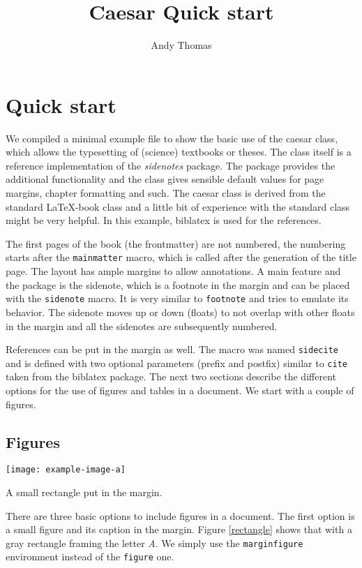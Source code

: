\documentclass{shindig_book}
\title{Caesar Quick start}
\author{Andy Thomas}
\begin{document}
\frontmatter
\maketitlepage
\tableofcontents
\mainmatter
\chapter{Quick start}
%
We compiled a minimal example file to show the basic use of the caesar class, which allows the typesetting of (science) textbooks or theses. The class itself is a reference implementation of the \emph{sidenotes} package. The package provides the additional functionality and the class gives sensible default values for page margins, chapter formatting and such. The caesar class is derived from the standard \LaTeX-book class and a little bit of experience with the standard class might be very helpful. In this example, biblatex is used for the references.

The first pages of the book (the frontmatter) are not numbered, the numbering starts after the \texttt{mainmatter} macro, which is called after the generation of the title page. The layout has ample margins to allow annotations. A main feature and the package is the sidenote, which is a footnote in the margin and can be placed with the \texttt{sidenote} macro. It is very similar to \texttt{footnote} and tries to emulate its behavior. The sidenote moves up or down (floats) to not overlap with other floats in the margin and all the sidenotes are subsequently numbered. 

References can be put in the margin as well. The macro was named \texttt{sidecite} and is defined with two optional parameters (prefix and postfix) similar to \texttt{cite} taken from the biblatex package. The next two sections describe the different options for the use of figures and tables in a document. We start with a couple of figures.
\section{Figures}
%
\begin{marginfigure}%
    \texttt{[image: example-image-a]}%
    \caption{A small rectangle put in the margin.\label{rectangle}}%
\end{marginfigure}%
%
There are three basic options to include figures in a document. The first option is a small figure and its caption in the margin. Figure \ref{rectangle} shows that with a gray rectangle framing the letter \emph{A}. We simply use the \texttt{marginfigure} environment instead of the \texttt{figure} one. 
\end{document}
